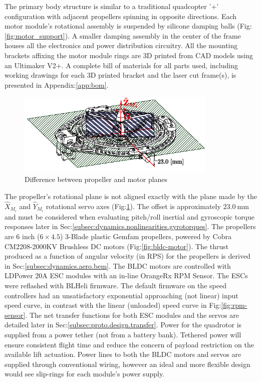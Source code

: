\par
The primary body structure is similar to a traditional quadcopter '+' configuration with adjacent propellers spinning in opposite directions. Each motor module's rotational assembly is suspended by silicone damping balls (Fig:\ref{fig:motor_support}). A smaller damping assembly in the center of the frame houses all the electronics and power distribution circuitry. All the mounting brackets affixing the motor module rings are 3D printed from CAD models using an Ultimaker V2+\cite{ultimaker}. A complete bill of materials for all parts used, including working drawings for each 3D printed bracket and the laser cut frame(s), is presented in Appendix:\ref{app:bom}.
\par
\begin{figure}[hbtp]
\centering
\includegraphics[width=0.85\textwidth]{figs/motor-prop}
\vspace{-10pt}
\caption{Difference between propeller and motor planes}
\label{fig:motor_prop}
\vspace{-15pt}
\end{figure}
The propeller's rotational plane is not aligned exactly with the plane made by the $\hat{X}_{M_i}$ and $\hat{Y}_{M_i}$ rotational servo axes (Fig:\ref{fig:motor_prop}). The offset is approximately $23.0~\text{mm}$ and must be considered when evaluating pitch/roll inertial and gyroscopic torque responses later in Sec:\ref{subsec:dynamics.nonlinearities.gyrotorques}. The propellers are 6 inch ($6 \times 4.5$) 3-Blade plastic Gemfam propellers, powered by Cobra CM2208-2000KV Brushless DC motors (Fig:\ref{fig:bldc-motor}). The thrust produced as a function of angular velocity (in RPS) for the propellers is derived in Sec:\ref{subsec:dynamics.aero.bem}. 
\newpage
The BLDC motors are controlled with LDPower 20A ESC modules with an in-line OrangeRx RPM Sensor. The ESCs were reflashed with BLHeli\cite{BLHeli} firmware. The default firmware on the speed controllers had an unsatisfactory exponential approaching (not linear) input speed curve, in contrast with the linear (unloaded) speed curve in Fig:\ref{fig:rpm-sensor}. The net transfer functions for both ESC modules and the servos are detailed later in Sec:\ref{subsec:proto.design.transfer}. Power for the quadrotor is supplied from a power tether (not from a battery bank). Tethered power will ensure consistent flight time and reduce the concern of payload restriction on the available lift actuation. Power lines to both the BLDC motors and servos are supplied through conventional wiring, however an ideal and more flexible design would see slip-rings for each module's power supply. 
